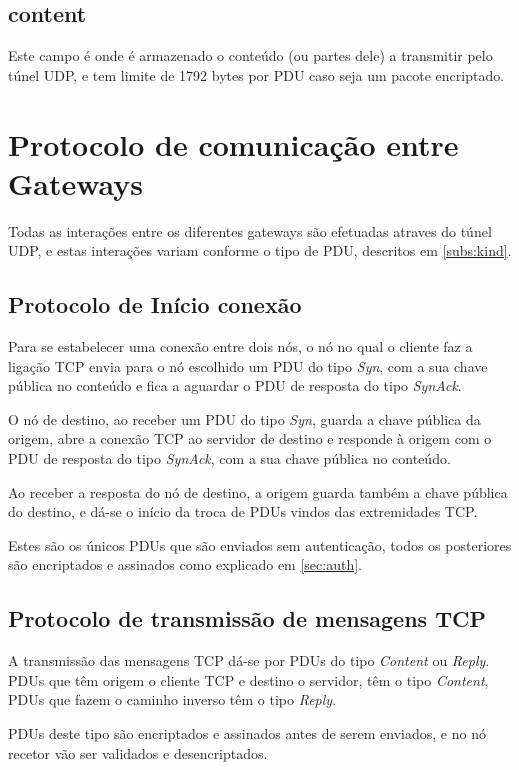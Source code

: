 \documentclass[a4paper]{report}
\begin{document}
\subsection{content}

Este campo é onde é armazenado o conteúdo (ou partes dele) a transmitir pelo
túnel UDP, e tem limite de 1792 bytes por PDU caso seja um pacote encriptado.

\section{Protocolo de comunicação entre Gateways}

Todas as interações entre os diferentes gateways são efetuadas atraves do túnel
UDP, e estas interações variam conforme o tipo de PDU, descritos em 
\ref{subs:kind}.

\subsection{Protocolo de Início conexão}

Para se estabelecer uma conexão entre dois nós, o nó no qual o cliente
faz a ligação TCP envia para o nó escolhido um PDU do tipo \textit{Syn},
com a sua chave pública no conteúdo e fica a aguardar o PDU de resposta 
do tipo \textit{SynAck}.

O nó de destino, ao receber um PDU do tipo \textit{Syn}, guarda
a chave pública da origem, abre a conexão TCP ao servidor de destino e
responde à origem com o PDU de resposta do tipo \textit{SynAck}, com a sua
chave pública no conteúdo.

Ao receber a resposta do nó de destino, a origem guarda também a chave
pública do destino, e dá-se o início da troca de PDUs vindos das 
extremidades TCP.

Estes são os únicos PDUs que são enviados sem autenticação, todos os
posteriores são encriptados e assinados como explicado em \ref{sec:auth}.

\subsection{Protocolo de transmissão de mensagens TCP}

A transmissão das mensagens TCP dá-se por PDUs do tipo \textit{Content} ou
\textit{Reply}. PDUs que têm origem o cliente TCP e destino o servidor,
têm o tipo \textit{Content}, PDUs que fazem o caminho inverso têm o tipo
\textit{Reply}.

PDUs deste tipo são encriptados e assinados antes de serem enviados, e no
nó recetor vão ser validados e desencriptados.
\end{document}
